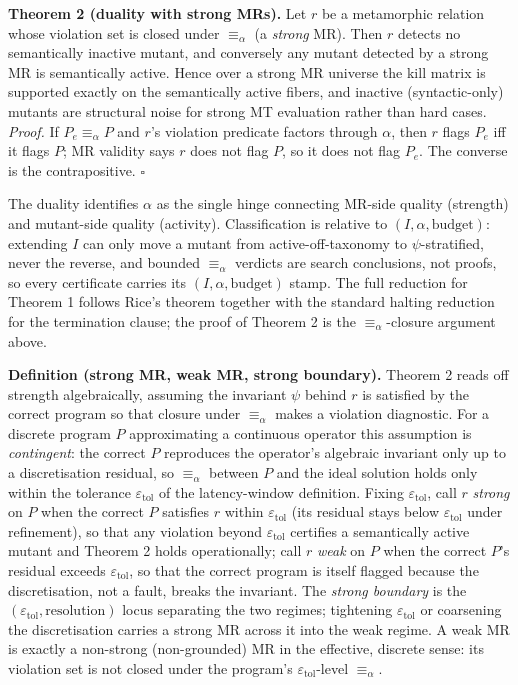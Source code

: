 \documentclass[acmsmall,screen,review]{acmart}
\begin{document}
\textbf{Theorem 2 (duality with strong MRs).} Let $r$ be a
metamorphic relation whose violation set is closed under $\equiv_\alpha$
(a \emph{strong} MR). Then $r$ detects no semantically inactive
mutant, and conversely any mutant detected by a strong MR is
semantically active. Hence over a strong MR universe the kill matrix
is supported exactly on the semantically active fibers, and inactive
(syntactic-only) mutants are structural noise for strong MT evaluation
rather than hard cases. \emph{Proof.} If $P_e \equiv_\alpha P$ and $r$'s
violation predicate factors through $\alpha$, then $r$ flags $P_e$ iff
it flags $P$; MR validity says $r$ does not flag $P$, so it does not
flag $P_e$. The converse is the contrapositive. $\square$

The duality identifies $\alpha$ as the single hinge connecting MR-side
quality (strength) and mutant-side quality (activity). Classification
is relative to $(I, \alpha, \text{budget})$: extending $I$ can only move
a mutant from active-off-taxonomy to $\psi$-stratified, never the
reverse, and bounded $\equiv_\alpha$ verdicts are search conclusions,
not proofs, so every certificate carries its $(I, \alpha, \text{budget})$
stamp. The full reduction for Theorem 1 follows Rice's theorem together
with the standard halting reduction for the termination clause; the
proof of Theorem 2 is the $\equiv_\alpha$-closure argument above.

\textbf{Definition (strong MR, weak MR, strong boundary).} Theorem 2
reads off strength algebraically, assuming the invariant $\psi$ behind
$r$ is satisfied by the correct program so that closure under
$\equiv_\alpha$ makes a violation diagnostic. For a discrete program $P$
approximating a continuous operator this assumption is \emph{contingent}:
the correct $P$ reproduces the operator's algebraic invariant only up to
a discretisation residual, so $\equiv_\alpha$ between $P$ and the ideal
solution holds only within the tolerance $\varepsilon_{\mathrm{tol}}$ of
the latency-window definition. Fixing $\varepsilon_{\mathrm{tol}}$, call
$r$ \emph{strong} on $P$ when the correct $P$ satisfies $r$ within
$\varepsilon_{\mathrm{tol}}$ (its residual stays below
$\varepsilon_{\mathrm{tol}}$ under refinement), so that any violation
beyond $\varepsilon_{\mathrm{tol}}$ certifies a semantically active
mutant and Theorem 2 holds operationally; call $r$ \emph{weak} on $P$
when the correct $P$'s residual exceeds $\varepsilon_{\mathrm{tol}}$, so
that the correct program is itself flagged because the discretisation,
not a fault, breaks the invariant. The \emph{strong boundary} is the
$(\varepsilon_{\mathrm{tol}}, \text{resolution})$ locus separating the
two regimes; tightening $\varepsilon_{\mathrm{tol}}$ or coarsening the
discretisation carries a strong MR across it into the weak regime. A weak
MR is exactly a non-strong (non-grounded) MR in the effective, discrete
sense: its violation set is not closed under the program's
$\varepsilon_{\mathrm{tol}}$-level $\equiv_\alpha$.
\end{document}
